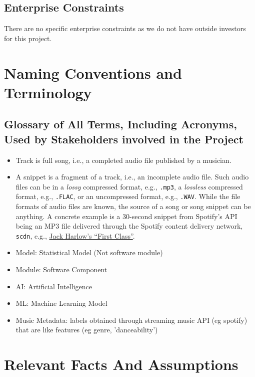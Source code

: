 \documentclass[12pt]{article}
\begin{document}
\subsection{Enterprise Constraints}
There are no specific enterprise constraints as we do not have outside investors
for this project. 

\section{Naming Conventions and Terminology}
\subsection{Glossary of All Terms, Including Acronyms, Used by Stakeholders
involved in the Project}
\begin{itemize}
  \item Track is full song, i.e., a completed audio file published by a musician. 
  \item A snippet is a fragment of a track, i.e., an incomplete audio file. Such audio files can be in a \emph{lossy} compressed format, e.g., 
  \texttt{.mp3}, a \emph{lossless} compressed format, e.g., \texttt{.FLAC}, or an uncompressed format, e.g., \texttt{.WAV}. While the file formats of audio files are known, 
  the source of a song or song snippet can be anything. A concrete example is a 30-second snippet from Spotify's API being an MP3 file delivered through the Spotify content 
  delivery network, \texttt{scdn}, e.g., \href{https://p.scdn.co/mp3-preview/c05a687254dbdf50a9ab4879d85e54a7594e367f?cid=945b9ed74f4c43b49bcf26e7dc388df0}{Jack Harlow's ``First Class''}.
  \item Model: Statistical Model (Not software module)
  \item Module: Software Component
  \item AI: Artificial Intelligence
  \item ML: Machine Learning Model
  \item Music Metadata: labels obtained through streaming music API (eg spotify) that are
  like features (eg genre, 'danceability')
\end{itemize}

\section{Relevant Facts And Assumptions}
\end{document}

